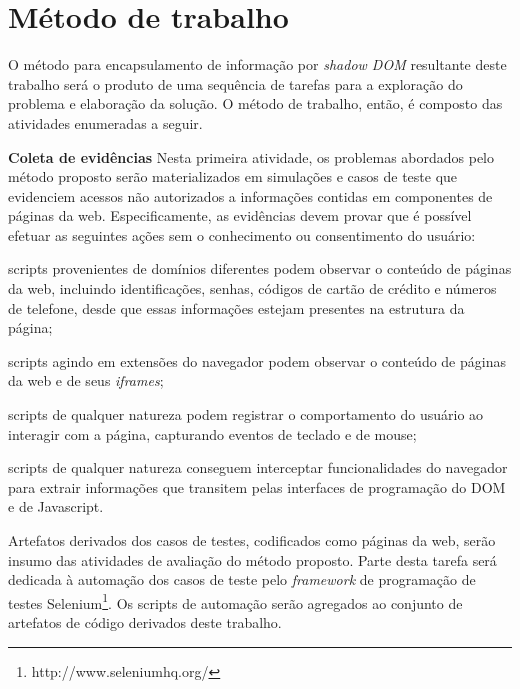 \section{Método de trabalho}


O método para encapsulamento de informação por \textit{shadow DOM} resultante deste trabalho será o produto de uma sequência de tarefas para a exploração do problema e elaboração da solução. O método de trabalho, então, é composto das atividades enumeradas a seguir.


\begin{alineas}
	\item \textbf{Coleta de evidências}
	Nesta primeira atividade, os problemas abordados pelo método proposto serão materializados em simulações e casos de teste que evidenciem acessos não autorizados a informações contidas em componentes de páginas da web. Especificamente, as evidências devem provar que é possível efetuar as seguintes ações sem o conhecimento ou consentimento do usuário:
	
	\begin{alineas}
		\item scripts provenientes de domínios diferentes podem observar o conteúdo de páginas da web, incluindo identificações, senhas, códigos de cartão de crédito e números de telefone, desde que essas informações estejam presentes na estrutura da página;
		\item scripts agindo em extensões do navegador podem observar o conteúdo de páginas da web e de seus \textit{iframes};
		\item scripts de qualquer natureza podem registrar o comportamento do usuário ao interagir com a página, capturando eventos de teclado e de mouse;
		\item scripts de qualquer natureza conseguem interceptar funcionalidades do navegador para extrair informações que transitem pelas interfaces de programação do DOM e de Javascript.
	\end{alineas}
	
	Artefatos derivados dos casos de testes, codificados como páginas da web, serão insumo das atividades de avaliação do método proposto. Parte desta tarefa será dedicada à automação dos casos de teste pelo \textit{framework} de programação de testes Selenium\footnote{http://www.seleniumhq.org/}. Os scripts de automação serão agregados ao conjunto de artefatos de código derivados deste trabalho.
	

\end{alineas}
